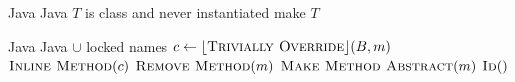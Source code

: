\begin{algorithm}
\caption{$\refactoring{Make Type Abstract}(T : \type{Type})$}
\label{alg:MakeTypeAbstract}
\begin{algorithmic}[1]
\REQUIRE Java
\ENSURE Java
\medskip
{}
    \RETURN
\ENDIF
\STATE \assert $T$ is class and never instantiated
\STATE make $T$ 
\end{algorithmic}
\end{algorithm}

\begin{algorithm}
\caption{$\refactoring{Push Down Virtual Method}(m : \type{VirtualMethod})$}
\label{alg:PushDownVirtualMethod}
\begin{algorithmic}[1]
\REQUIRE Java
\ENSURE Java $\cup$ locked names
\medskip
{}
  \STATE $c \leftarrow \lfloor\textsc{Trivially Override}\rfloor(B, m)$
    \STATE $\textsc{Inline Method}(c)$
  \ENDIF
\ENDFOR
\STATE $\textsc{Remove Method}(m)$
\STATE \qquad\orelse$\textsc{Make Method Abstract}(m)$
\STATE \qquad\orelse$\textsc{Id}()$
\end{algorithmic}
\end{algorithm}

